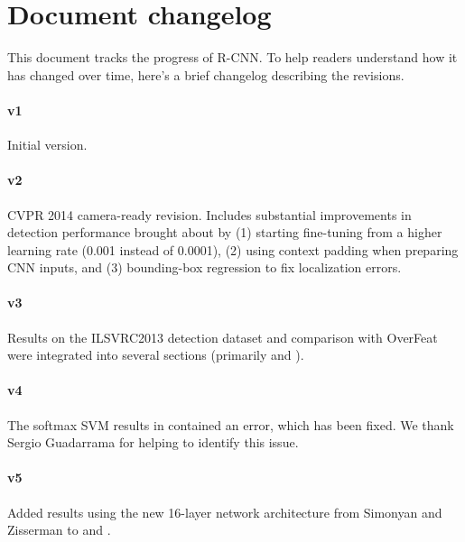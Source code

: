 \section{Document changelog}

This document tracks the progress of R-CNN.
To help readers understand how it has changed over time, here's a brief changelog describing the revisions.

\paragraph{v1} Initial version.

\paragraph{v2} CVPR 2014 camera-ready revision. Includes substantial improvements in detection performance brought about by (1) starting fine-tuning from a higher learning rate (0.001 instead of 0.0001), (2) using context padding when preparing CNN inputs, and (3) bounding-box regression to fix localization errors. 

\paragraph{v3} Results on the ILSVRC2013 detection dataset and comparison with OverFeat were integrated into several sections (primarily  and ).

\paragraph{v4} The softmax \vs SVM results in  contained an error, which has been fixed. We thank Sergio Guadarrama for helping to identify this issue.

\paragraph{v5} Added results using the new 16-layer network architecture from Simonyan and Zisserman \cite{vggverydeep} to  and .
